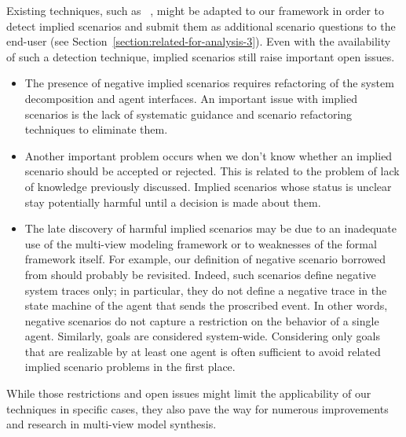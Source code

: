 Existing techniques, such as ~\cite{Uchitel:2004}, might be adapted to our framework in order to detect implied scenarios and submit them as additional scenario questions to the end-user (see Section~\ref{section:related-for-analysis-3}). Even with the availability of such a detection technique, implied scenarios still raise important open issues.
\begin{itemize}
\item The presence of negative implied scenarios requires refactoring of the system decomposition and agent interfaces. An important issue with implied scenarios is the lack of systematic guidance and scenario refactoring techniques to eliminate them.
\item Another important problem occurs when we don't know whether an implied scenario should be accepted or rejected. This is related to the problem of lack of knowledge previously discussed. Implied scenarios whose status is unclear stay potentially harmful until a decision is made about them.
\item The late discovery of harmful implied scenarios may be due to an inadequate use of the multi-view modeling framework or to weaknesses of the formal framework itself. For example, our definition of negative scenario borrowed from \cite{Uchitel:2002} should probably be revisited. Indeed, such scenarios define negative system traces only; in particular, they do not define a negative trace in the state machine of the agent that sends the proscribed event. In other words, negative scenarios do not capture a restriction on the behavior of a single agent. Similarly, goals are considered system-wide. Considering only goals that are realizable by at least one agent is often sufficient to avoid related implied scenario problems in the first place.
\end{itemize}

While those restrictions and open issues might limit the applicability of our techniques in specific cases, they also pave the way for numerous improvements and research in multi-view model synthesis.
